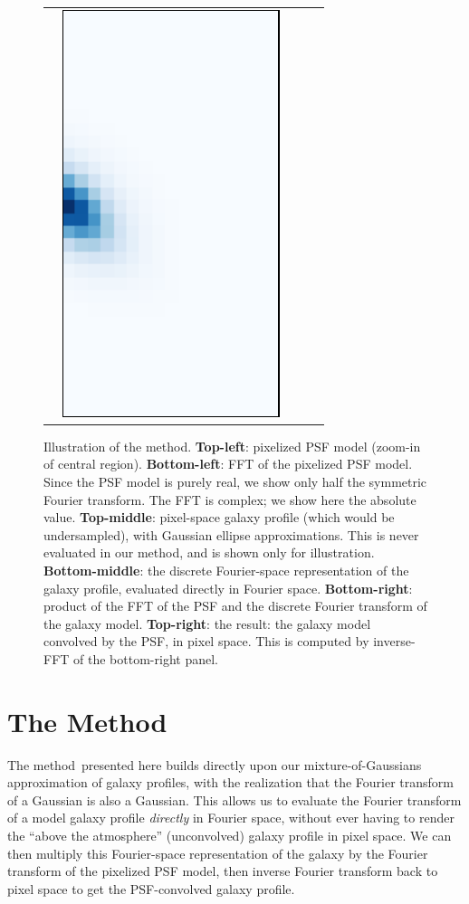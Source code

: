 \documentclass[11pt,preprint]{aastex}
\newcommand{\trick}{method}
\newcommand{\Trick}{Method}
\begin{document}
\begin{figure}
\begin{center}
\begin{tabular}{@{}c@{}c@{}c@{}c@{}c@{}}
      &
      \multicolumn{1}{r}{%
        \includegraphics[height=0.22\textwidth]{psf-03}}
    \end{tabular}
  \end{center}
  \caption{\label{fig:example}%
    Illustration of the \trick.
    \textbf{Top-left}: pixelized PSF model (zoom-in of central region).
    \textbf{Bottom-left}: FFT of the pixelized PSF model.  Since the PSF model is
    purely real, we show only half the symmetric Fourier transform. The FFT is
    complex; we show here the absolute value.
    \textbf{Top-middle}: pixel-space galaxy profile (which would be
    undersampled), with Gaussian ellipse approximations.  This is
    never evaluated in our method, and is shown only for illustration.
    \textbf{Bottom-middle}: the discrete Fourier-space representation of the
    galaxy profile, evaluated directly in Fourier space.
    \textbf{Bottom-right}: product of the FFT of the PSF and the
    discrete Fourier transform of the galaxy model.
    \textbf{Top-right}: the result: the galaxy model convolved by the
    PSF, in pixel space.  This is computed by inverse-FFT of the
    bottom-right panel.
  }
\end{figure}

\section{The \Trick}

The \trick\ presented here builds directly upon our mixture-of-Gaussians
approximation of galaxy profiles, with the realization that the
Fourier transform of a Gaussian is also a Gaussian.  This allows us to
evaluate the Fourier transform of a model galaxy profile \emph{directly} in Fourier
space, without ever having to render the ``above the atmosphere''
(unconvolved) galaxy profile in pixel space.
We can then multiply this Fourier-space
representation of the galaxy by the Fourier transform of the pixelized
PSF model, then inverse Fourier transform back to pixel space to get
the PSF-convolved galaxy profile.
\end{document}
